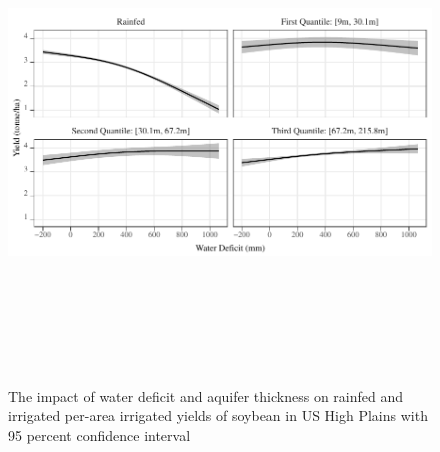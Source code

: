 \documentclass[
]{article}
\begin{document}
\begin{figure}[H]

{\centering \includegraphics[width=6in,height=500px,]{Figures/g_yield_with_conf_soy} 

}

\caption{The impact of water deficit and aquifer thickness on rainfed and irrigated per-area irrigated yields of soybean in US High Plains with 95 percent confidence interval}\label{fig:irrigated-yield-ind-soy}
\end{figure}
\end{document}
